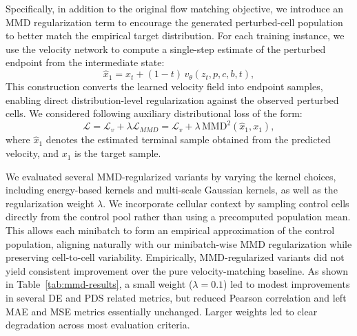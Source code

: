 \documentclass[11pt]{article}
\begin{document}
Specifically, in addition to the original flow matching objective, we introduce an MMD regularization term to encourage the generated perturbed-cell population to better match the empirical target distribution. For each training instance, we use the velocity network to compute a single-step estimate of the perturbed endpoint from the intermediate state:
\begin{equation}
\hat{x}_1
=
x_t + (1-t)\, v_{\theta}(z_t, p, c, b, t),
\end{equation}
This construction converts the learned velocity field into endpoint samples, enabling direct distribution-level regularization against the observed perturbed cells. We considered following auxiliary distributional loss of the form:
\begin{equation}
  \mathcal{L}
  =
  \mathcal{L}_{v}
  +
  \lambda\mathcal{L}_{MMD}
  =
  \mathcal{L}_{v}
  +
  \lambda \, \mathrm{MMD}^2(\hat{x}_1, x_1),
\end{equation}
where \(\hat{x}_1\) denotes the estimated terminal sample obtained from the predicted velocity, and \(x_1\) is the target sample. 

We evaluated several MMD-regularized variants by varying the kernel choices, including energy-based kernels and multi-scale Gaussian kernels, as well as the regularization weight \(\lambda\). We incorporate cellular context by sampling control cells directly from the control pool rather than using a precomputed population mean. This allows each minibatch to form an empirical approximation of the control population, aligning naturally with our minibatch-wise MMD regularization while preserving cell-to-cell variability. Empirically, MMD-regularized variants did not yield consistent improvement over the pure velocity-matching baseline. 
As shown in Table~\ref{tab:mmd-results}, 
a small weight (\(\lambda=0.1\)) led to modest improvements in several DE and PDS related metrics, but reduced Pearson correlation and left MAE and MSE metrics essentially unchanged. Larger weights led to clear degradation across most evaluation criteria. 
\end{document}
